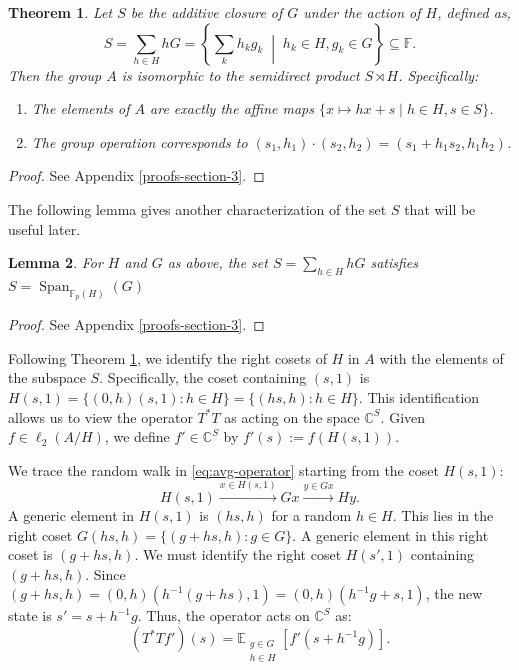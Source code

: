 \documentclass[11pt]{article}
\theoremstyle{plain}
\newtheorem{theorem}{Theorem}[section]
\newtheorem{lemma}[theorem]{Lemma}
\theoremstyle{definition}
\DeclareMathOperator{\Span}{Span}
\begin{document}
\begin{theorem}
\label{thm:structural-theorem}
Let $S$ be the additive closure of $G$ under the action of $H$, defined as,
\[
    S = \sum_{h \in H} hG = \left\{ \sum_{k} h_k g_k \;\middle|\; h_k \in H, g_k \in G \right\} \subseteq \mathbb{F}.
\]
Then the group $A$ is isomorphic to the semidirect product $S \rtimes H$. Specifically:
\begin{enumerate}
    \item The elements of $A$ are exactly the affine maps $\{ x \mapsto hx + s \mid h \in H, s \in S \}$.
    \item The group operation corresponds to $(s_1, h_1) \cdot (s_2, h_2) = (s_1 + h_1 s_2, h_1 h_2)$.
\end{enumerate}
\end{theorem}

\begin{proof}
See Appendix \ref{proofs-section-3}.
\end{proof}


The following lemma gives another characterization of the set $S$ that will be useful later. 
\begin{lemma}
\label{lem:S-span}
For $H$ and $G$ as above, the set $S
= \sum_{h\in H} hG
$ satisfies 
$S = \Span_{\mathbb F_p(H)}(G)$
\end{lemma}

\begin{proof}
    See Appendix \ref{proofs-section-3}.
\end{proof}




Following Theorem \ref{thm:structural-theorem}, we identify the right cosets of $H$ in $A$ with the elements of the subspace $S$. Specifically, the coset containing $(s,1)$ is $H(s,1) = \{(0,h)(s,1) : h \in H\} = \{(hs, h) : h \in H\}$.
This identification allows us to view the operator $T^* T$ as acting on the space $\mathbb{C}^S$. Given $f \in \ell_2(A/H)$, we define $f' \in \mathbb{C}^S$ by $f'(s) := f(H(s,1))$.

We trace the random walk in \eqref{eq:avg-operator} starting from the coset $H(s,1)$:
\[
    H(s,1) \xrightarrow{x \in H(s,1)} Gx \xrightarrow{y \in Gx} Hy.
\]
A generic element in $H(s,1)$ is $(hs, h)$ for a random $h \in H$. This lies in the right coset $G(hs, h) = \{(g+hs, h) : g \in G\}$. A generic element in this right coset is $(g+hs, h)$.
We must identify the right coset $H(s', 1)$ containing $(g+hs, h)$.
Since $(g+hs, h) = (0,h)(h^{-1}(g+hs), 1) = (0,h)(h^{-1}g + s, 1)$, the new state is $s' = s + h^{-1}g$.
Thus, the operator acts on $\mathbb{C}^S$ as:
\begin{equation}
    \label{eq:conv-operator}
    (T^* T f')(s) = \mathbb{E}_{\substack{g \in G \\ h \in H}} \left[ f'(s + h^{-1}g) \right].
\end{equation}
\end{document}
